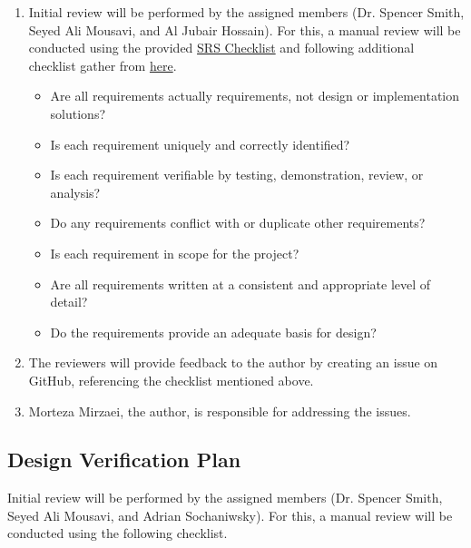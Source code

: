 \documentclass[12pt, titlepage]{article}
\begin{document}
\begin{enumerate}
\item Initial review will be performed by the assigned members
      (Dr. Spencer Smith, Seyed Ali Mousavi, and Al Jubair Hossain).
      For this, a manual review will be conducted using the provided 
      \href{https://github.com/mirzaim/ipcs/blob/main/docs/Checklists/SRS-Checklist.pdf}{SRS Checklist} 
      and following additional checklist gather from 
      \href{https://www.cs.toronto.edu/~sme/CSC340F/2005/assignments/inspections/reqts_checklist.pdf}{here}.
      \begin{itemize}\renewcommand{\labelitemi}{\scriptsize$\square$}
        \item Are all requirements actually requirements, not design or implementation solutions?
        \item Is each requirement uniquely and correctly identified?
        \item Is each requirement verifiable by testing, demonstration, review, or analysis?
        \item Do any requirements conflict with or duplicate other requirements?
        \item Is each requirement in scope for the project?
        \item Are all requirements written at a consistent and appropriate level of detail?
        \item Do the requirements provide an adequate basis for design?
      \end{itemize}
\item The reviewers will provide feedback to the author by creating an issue on GitHub,
      referencing the checklist mentioned above.
\item Morteza Mirzaei, the author, is responsible for addressing the issues.
\end{enumerate}




\subsection{Design Verification Plan} \label{sebsec_design_verification_plan}

Initial review will be performed by the assigned members 
(Dr. Spencer Smith, Seyed Ali Mousavi, and Adrian Sochaniwsky). 
For this, a manual review will be conducted using the following checklist.
\end{document}
